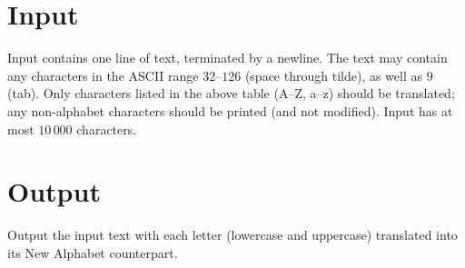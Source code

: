 \section*{Input}

Input contains one line of text, terminated by a newline.
The text may contain any characters in the ASCII range $32$--$126$ (space through tilde), as well as $9$ (tab).
Only characters listed in the above table (A--Z, a--z) should be translated; any non-alphabet characters should be printed (and not modified).
Input has at most $10\,000$ characters.


\section*{Output}

Output the input text with each letter (lowercase and uppercase) translated into its New Alphabet counterpart.
